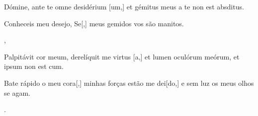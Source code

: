 {  {\item {}Dómine, ante te omne desidérium [um,] et gémitus meus a te non est absditus.~\Responsorium}%
    {\item {}Conheceis meu desejo, Se[,] meus gemidos vos são manitos.~\Responsorium},
  {\item {}Palpitávit cor meum, derelíquit me virtus [a,] et lumen oculórum meórum, et ipsum non est \-cum.~\Responsorium}%
    {\item {}Bate rápido o meu cora[,] minhas forças estão me dei[do,] e sem luz os meus olhos se agam.~\Responsorium}.
}